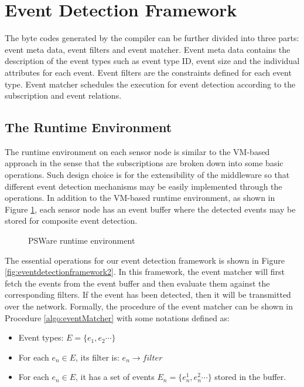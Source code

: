 \section{Event Detection Framework}
\label{sec:design:eventDetectionFramework}
The byte codes generated by the compiler can be further divided into three parts: event meta data, event filters and event matcher. Event meta data contains the description of the event types such as event type ID, event size and the individual attributes for each event. Event filters are the constraints defined for each event type. Event matcher schedules the execution for event detection according to the subscription and event relations.

\subsection{The Runtime Environment}
The runtime environment on each sensor node is similar to the VM-based approach \cite{mate} in the sense that the subscriptions are broken down into some basic operations. Such design choice is for the extensibility of the middleware so that different event detection mechanisms may be easily implemented through the operations. In addition to the VM-based runtime environment, as shown in Figure \ref{fig:pswarevm}, each sensor node has an event buffer where the detected events may be stored for composite event detection.

\begin{figure}
\centering
{}
\caption{PSWare runtime environment}
\label{fig:pswarevm}
\end{figure}

The essential operations for our event detection framework is shown in Figure \ref{fig:eventdetectionframework2}. In this framework, the event matcher will first fetch the events from the event buffer and then evaluate them against the corresponding filters. If the event has been detected, then it will be transmitted over the network. Formally, the procedure of the event matcher can be shown in Procedure \ref{algo:eventMatcher} with some notations defined as:
\begin{itemize}
\item Event types: \(E=\{e_1, e_2 \cdots \}\)
\item For each \(e_n\in E\), its filter is: \(e_n\rightarrow filter\)
\item For each \(e_n\in E\), it has a set of events \(E_n=\{e_n^1, e_n^2 \cdots \}\) stored in the buffer.
\end{itemize}

